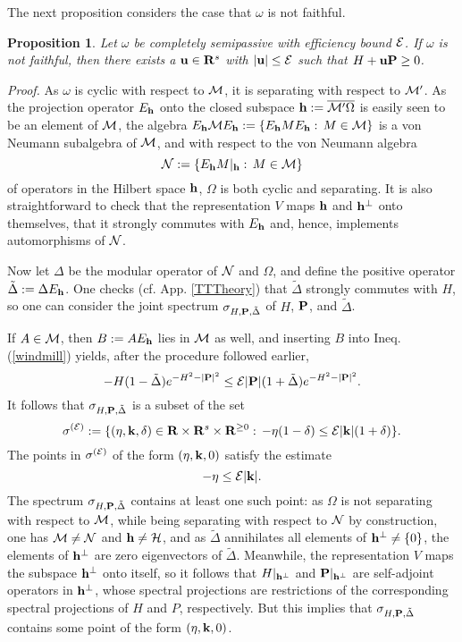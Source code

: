 \documentclass[a4paper,11pt]{article}
\newtheorem{proposition}[theorem]{Proposition}{\bf}{\it}
\def\dt{\cal}
\def\dM{{\dt M}}
\def\dN{{\dt N}}
\def\E{{\cal E}}
\def\H{{\cal H}}
\def\gO{\Omega}
\def\go{\omega}
\def\h{{\bf h}}
\def\impuls{k}
\def\reals{{\bf R}}
\begin{document}
\bigskip
The next proposition considers the case that $\go$ is not faithful.

\begin{proposition}\label{ifnot}
Let $\go$ be completely semipassive with efficiency bound
$\E$. If $\go$ is not faithful, then there exists a ${\bf u}\in\reals^s$
with $|{\bf u}|\leq\E$
such that $H+{\bf uP}\geq0$.
\end{proposition}
{\it Proof.} As $\go$ is cyclic with respect to $\dM$, it is separating with
respect to $\dM'$. As the
projection operator $E_\h$ onto the closed subspace
$\h:=\overline{\dM'\gO}$ is easily seen to be an element of $\dM$, the
algebra $E_\h\dM E_\h:=\{E_\h ME_\h:\,M\in\dM\}$ is a von Neumann
subalgebra of $\dM$, and with respect to the von Neumann algebra
$$\dN:=\{E_{\h}M|_\h:\,M\in\dM\}$$
of operators in the Hilbert space $\h$,
$\gO$ is both cyclic and separating.  It is also
straightforward to check that the representation $V$ maps $\h$ and
$\h^{\perp}$ onto themselves, that it strongly commutes with $E_\h$
and, hence, implements automorphisms of $\dN$.

Now let $\Delta$ be the modular operator of $\dN$ and $\gO$, and
define the positive operator
$\tilde\Delta:=\Delta E_\h$. One checks (cf. App. \ref{TTTheory}) that
$\tilde\Delta$ strongly commutes with $H$, so one can consider
the joint spectrum  $\sigma_{H,{\bf P},\tilde\Delta}$ of
$H$, ${\bf P}$, and $\tilde\Delta$.

If $A\in\dM$, then $B:=AE_\h$ lies in $\dM$
as well, and inserting $B$ into Ineq. (\ref{windmill}) yields,
after the procedure followed earlier,
$$-H(1-\tilde\Delta)e^{-H^2-|{\bf P}|^2}
\leq\E|{\bf P}|(1+\tilde\Delta)e^{-H^2-|{\bf P}|^2}.$$
It follows that
$\sigma_{H,{\bf P},\tilde\Delta}$ is a subset of the set
$$\sigma^{(\E)}:=\{(\eta,{\bf\impuls},\delta)
\in\reals\times\reals^s\times\reals^{\geq0}:\,
-\eta(1-\delta)\leq\E|{\bf\impuls}|(1+\delta)\}.$$
The points in $\sigma^{(\E)}$ of the form $(\eta,{\bf k},0)$
satisfy the estimate
\begin{equation}\label{constraint3}
-\eta\leq\E|{\bf\impuls}|.
\end{equation}
The spectrum $\sigma_{H,{\bf P},\tilde\Delta}$ contains at least one
such point: as $\gO$ is not separating with respect to $\dM$,
while being separating with respect to $\dN$ by construction, one has
$\dM\not=\dN$ and $\h\not=\H$, and as $\tilde\Delta$ annihilates all elements
of $\h^\perp\not=\{0\}$, the elements of $\h^\perp$ are zero eigenvectors
of $\tilde\Delta$. Meanwhile, the representation $V$ maps
the subspace $\h^\perp$ onto itself, so it follows that
$H|_{\h^\perp}$ and ${\bf P}|_{\h^\perp}$ are self-adjoint
operators in $\h^\perp$, whose spectral projections are
restrictions of the corresponding spectral projections of
$H$ and $P$, respectively.
But this implies that $\sigma_{H,{\bf P},\tilde\Delta}$
contains some point of the form $(\eta,{\bf\impuls},0)$.
\end{document}
